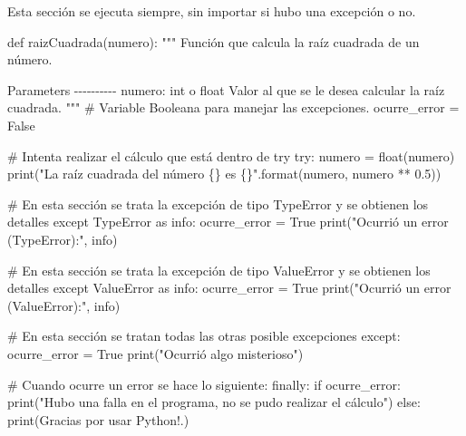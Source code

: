 \documentclass[
  letterpaper,
  DIV=11,
  numbers=noendperiod]{scrreprt}
\newenvironment{Shaded}{\begin{snugshade}}{\end{snugshade}}
\newcommand{\BuiltInTok}[1]{\textcolor[rgb]{0.00,0.23,0.31}{#1}}
\newcommand{\CommentTok}[1]{\textcolor[rgb]{0.37,0.37,0.37}{#1}}
\newcommand{\ControlFlowTok}[1]{\textcolor[rgb]{0.00,0.23,0.31}{#1}}
\newcommand{\FloatTok}[1]{\textcolor[rgb]{0.68,0.00,0.00}{#1}}
\newcommand{\ImportTok}[1]{\textcolor[rgb]{0.00,0.46,0.62}{#1}}
\newcommand{\KeywordTok}[1]{\textcolor[rgb]{0.00,0.23,0.31}{#1}}
\newcommand{\NormalTok}[1]{\textcolor[rgb]{0.00,0.23,0.31}{#1}}
\newcommand{\OperatorTok}[1]{\textcolor[rgb]{0.37,0.37,0.37}{#1}}
\newcommand{\PreprocessorTok}[1]{\textcolor[rgb]{0.68,0.00,0.00}{#1}}
\newcommand{\SpecialCharTok}[1]{\textcolor[rgb]{0.37,0.37,0.37}{#1}}
\newcommand{\StringTok}[1]{\textcolor[rgb]{0.13,0.47,0.30}{#1}}
\newcommand{\VariableTok}[1]{\textcolor[rgb]{0.07,0.07,0.07}{#1}}
\begin{document}
Esta sección se ejecuta siempre, sin importar si hubo una excepción o
no.

\begin{Shaded}
\begin{Highlighting}[]
\KeywordTok{def}\NormalTok{ raizCuadrada(numero):}
    \CommentTok{"""}
\CommentTok{    Función que calcula la raíz cuadrada de un número.}

\CommentTok{    Parameters}
\CommentTok{    {-}{-}{-}{-}{-}{-}{-}{-}{-}{-}}
\CommentTok{    numero: int o float}
\CommentTok{    Valor al que se le desea calcular la raíz cuadrada.}
\CommentTok{    }
\CommentTok{    """}
    \CommentTok{\# Variable Booleana para manejar las excepciones.}
\NormalTok{    ocurre\_error }\OperatorTok{=} \VariableTok{False}
    
    \CommentTok{\# Intenta realizar el cálculo que está dentro de try}
    \ControlFlowTok{try}\NormalTok{:}
\NormalTok{        numero }\OperatorTok{=} \BuiltInTok{float}\NormalTok{(numero)}
        \BuiltInTok{print}\NormalTok{(}\StringTok{"La raíz cuadrada del número }\SpecialCharTok{\{\}}\StringTok{ es }\SpecialCharTok{\{\}}\StringTok{"}\NormalTok{.}\BuiltInTok{format}\NormalTok{(numero, numero }\OperatorTok{**} \FloatTok{0.5}\NormalTok{))}

    \CommentTok{\# En esta sección se trata la excepción de tipo TypeError y se obtienen los detalles  }
    \ControlFlowTok{except} \PreprocessorTok{TypeError} \ImportTok{as}\NormalTok{ info:}
\NormalTok{        ocurre\_error }\OperatorTok{=} \VariableTok{True}
        \BuiltInTok{print}\NormalTok{(}\StringTok{"Ocurrió un error (TypeError):"}\NormalTok{, info)}

    \CommentTok{\# En esta sección se trata la excepción de tipo ValueError y se obtienen los detalles  }
    \ControlFlowTok{except} \PreprocessorTok{ValueError} \ImportTok{as}\NormalTok{ info:}
\NormalTok{        ocurre\_error }\OperatorTok{=} \VariableTok{True}
        \BuiltInTok{print}\NormalTok{(}\StringTok{"Ocurrió un error (ValueError):"}\NormalTok{, info)}

    \CommentTok{\# En esta sección se tratan todas las otras posible excepciones}
    \ControlFlowTok{except}\NormalTok{:}
\NormalTok{        ocurre\_error }\OperatorTok{=} \VariableTok{True}
        \BuiltInTok{print}\NormalTok{(}\StringTok{"Ocurrió algo misterioso"}\NormalTok{)}

    \CommentTok{\# Cuando ocurre un error se hace lo siguiente:}
    \ControlFlowTok{finally}\NormalTok{:}
        \ControlFlowTok{if}\NormalTok{ ocurre\_error:}
            \BuiltInTok{print}\NormalTok{(}\StringTok{"Hubo una falla en el programa, no se pudo realizar el cálculo"}\NormalTok{)}
        \ControlFlowTok{else}\NormalTok{:}
            \BuiltInTok{print}\NormalTok{(}\StringTok{\textquotesingle{}Gracias por usar Python!.\textquotesingle{}}\NormalTok{)}
\end{Highlighting}
\end{Shaded}
\end{document}
